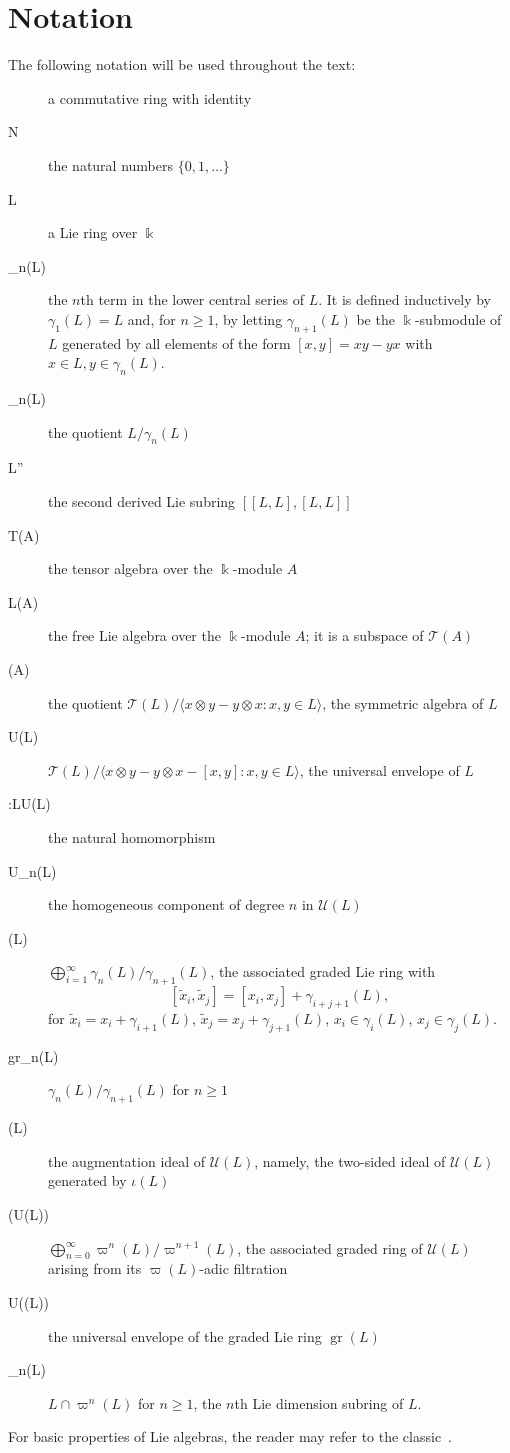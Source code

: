 \documentclass[a4paper,reqno,notitlepage]{amsart}
\theoremstyle{definition}
\newcommand{\N}{\mathbb N}
\newcommand\K{\Bbbk}
\newcommand\U{\mathscr U}
\newcommand\gr{\operatorname{gr}}
\begin{document}
\section{Notation}
The following notation will be used throughout the text:
\renewcommand{\descriptionlabel}[1]{\hspace{\labelsep}$#1\,=$}
\begin{description}
\item[\K] a commutative ring with identity
\item[\N] the natural numbers $\{0,1,\dots\}$
\item[L] a Lie ring over $\K$
\item[\gamma_n(L)] the $n$th term in the lower central series of
  $L$. It is defined inductively by $\gamma_1(L)=L$ and, for $n\geq
  1$, by letting $\gamma_{n+1}(L)$ be the $\K$-submodule of $L$
  generated by all elements of the form $[x,y]=xy-yx$ with $x\in
  L,y\in\gamma_n(L)$.
\item[\varGamma_n(L)] the quotient $L/\gamma_n(L)$
\item[L''] the second derived Lie subring $[[L,L],[L,L]]$
\item[\mathscr T(A)] the tensor algebra over the $\K$-module $A$
\item[\mathscr L(A)] the free Lie algebra over the $\K$-module $A$; it
  is a subspace of $\mathscr T(A)$
\item[(A)] the quotient $\mathscr T(L)/\langle
  x\otimes y-y\otimes x\colon x,y\in L\rangle$, the symmetric algebra
  of $L$
\item[\U(L)] $\mathscr T(L)/\langle x\otimes y-y\otimes x-[x,y]\colon
  x,y\in L\rangle$, the universal envelope of $L$
\item[\iota:L\to\U(L)] the natural homomorphism
\item[\U_n(L)] the homogeneous component of degree $n$ in
  $\U(L)$
\item[\gr(L)] $\bigoplus_{i=1}^\infty \gamma_n(L)/\gamma_{n+1}(L)$, the associated graded Lie ring with
  \[[\tilde{x}_i,\tilde{x}_j]=[x_i,x_j]+\gamma_{i+j+1}(L),\] for
  $\tilde{x}_i=x_i+\gamma_{i+1}(L)$, $\tilde{x}_j=x_j+\gamma_{j+1}(L)$,
  $x_i\in \gamma_i(L)$, $x_j\in \gamma_{j}(L)$.
\item[gr_n(L)] $\gamma_n(L)/\gamma_{n+1}(L)$ for $n\geq 1$
\item[\varpi(L)] the augmentation ideal of $\U(L)$, namely, the two-sided ideal of $\U(L)$ generated by $\iota(L)$
\item[\gr(\U(L))] $\bigoplus_{n=0}^\infty
  \varpi^n(L)/\varpi^{n+1}(L)$, the associated graded ring of
  $\U(L)$ arising from its $\varpi(L)$-adic filtration
\item[\U(\gr(L))] the universal envelope of the graded Lie ring
  $\gr(L)$
\item[\delta_n(L)] $L\cap \varpi^n(L)$ for $n\ge1$, the $n$th Lie
  dimension subring of $L$.
\end{description}
For basic properties of Lie algebras, the reader may refer to the
classic~\cite{Jacobson:1962}.
\end{document}
